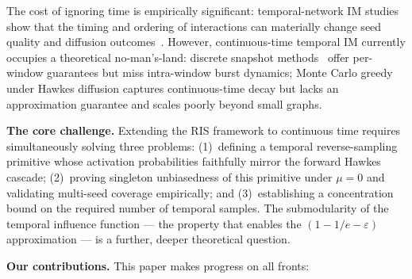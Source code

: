 \documentclass[10pt,conference]{IEEEtran}
\begin{document}
The cost of ignoring time is empirically significant: temporal-network IM studies show that the timing and ordering of interactions can materially change seed quality and diffusion outcomes~\cite{yanchenko2024}.
However, continuous-time temporal IM currently occupies a theoretical no-man's-land:
discrete snapshot methods~\cite{ohsaka2016} offer per-window guarantees but miss intra-window burst dynamics;
Monte Carlo greedy under Hawkes diffusion captures continuous-time decay but lacks an approximation guarantee and scales poorly beyond small graphs.

\textbf{The core challenge.}
Extending the RIS framework to continuous time requires simultaneously solving three problems:
(1)~defining a temporal reverse-sampling primitive whose activation probabilities faithfully mirror the forward Hawkes cascade;
(2)~proving singleton unbiasedness of this primitive under $\mu{=}0$ and validating multi-seed coverage empirically; and
(3)~establishing a concentration bound on the required number of temporal samples.
The submodularity of the temporal influence function — the property that enables the $(1-1/e-\varepsilon)$ approximation — is a further, deeper theoretical question.

\textbf{Our contributions.}
This paper makes progress on all fronts:
\end{document}
